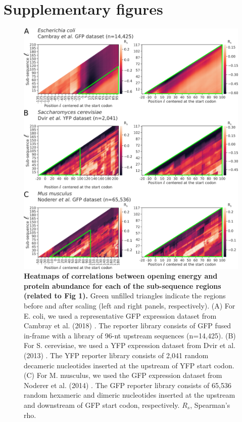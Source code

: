 \section{Supplementary figures}
\begin{figure}[htbp!]
	\center
	\includegraphics[width=1\textwidth]{appendix/TIsigner/Figs/S6.png}
	\caption[Heatmaps of correlations between opening energy and protein abundance for each of the sub-sequence regions (related to Fig 1).]{\textbf{Heatmaps of correlations between opening energy and protein abundance for each of the sub-sequence regions (related to Fig 1).} Green unfilled triangles indicate the regions before and after scaling (left and right panels, respectively). (A) For E. coli, we used a representative GFP expression dataset from Cambray et al. (2018) \cite{Cambray2018-kn}. The reporter library consists of GFP fused in-frame with a library of 96-nt upstream sequences (n=14,425). (B) For S. cerevisiae, we used a YFP expression dataset from Dvir et al. (2013) \cite{Dvir2013-lq}. The YFP reporter library consists of 2,041 random decameric nucleotides inserted at the upstream of YFP start codon. (C) For M. musculus, we used the GFP expression dataset from Noderer et al. (2014) \cite{Noderer2014-ve}. The GFP reporter library consists of 65,536 random hexameric and dimeric nucleotides inserted at the upstream and downstream of GFP start codon, respectively. $R_s$, Spearman’s rho.
	}%
	\label{fig:appendix_TIsigner_S6}
\end{figure}

